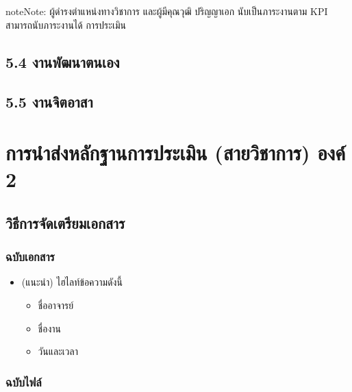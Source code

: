 \documentclass[a4paper,12pt,english]{sphinxmanual}
\begin{document}
\begin{sphinxadmonition}{note}{Note:}
ผู้ดำรงตำแหน่งทางวิชาการ และผู้มีคุณวุฒิ ปริญญาเอก นับเป็นภาระงานตาม KPI สามารถนับภาระงานได้  การประเมิน
\end{sphinxadmonition}


\section{5.4 งานพัฒนาตนเอง}
\label{\detokenize{5etc:id7}}

\section{5.5 งานจิตอาสา}
\label{\detokenize{5etc:id8}}

\chapter{การนำส่งหลักฐานการประเมิน (สายวิชาการ) องค์ 2}
\label{\detokenize{submission_part2:id1}}\label{\detokenize{submission_part2::doc}}

\section{วิธีการจัดเตรียมเอกสาร}
\label{\detokenize{submission_part2:id2}}

\subsection{ฉบับเอกสาร}
\label{\detokenize{submission_part2:id3}}\begin{itemize}
\item {} 
(แนะนำ) ไฮไลท์ข้อความดังนี้
\begin{itemize}
\item {} 
ชื่ออาจารย์

\item {} 
ชื่องาน

\item {} 
วันและเวลา

\end{itemize}

\end{itemize}


\subsection{ฉบับไฟล์}
\label{\detokenize{submission_part2:id4}}
\end{document}
